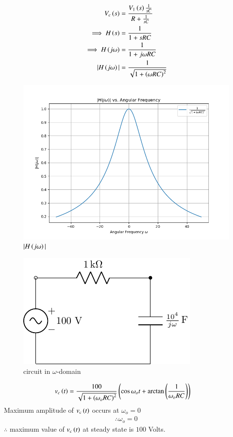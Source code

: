 \documentclass[journal,12pt,twocolumn]{IEEEtran}
\theoremstyle{remark}
\begin{document}
\begin{align}
V_c\left(s\right)&= \frac{V_1\left(s\right)\frac{1}{sC}}{R+\frac{1}{sC}}\\
\implies H\left(s\right) &= \frac{1}{1+ sRC}\\
\implies H\left(j\omega\right) &= \frac{1}{1+j\omega RC}\\
|H\left(j\omega\right)| &= \frac{1}{\sqrt{1+\left(\omega RC\right)^2}}
\end{align}
\begin{figure}[h!]
    \includegraphics[width = \columnwidth]{figs/Figure_1.png}
    \caption{$ |H\left(j\omega\right)|$ }
    \centering
    \label{fig: bm_16_fig_2}
\end{figure}


\begin{figure}[h!]
    \includegraphics[width = \columnwidth]{figs/c_fig2.pdf}
    \caption{circuit in $ \omega$-domain }
    \centering
    \label{fig: bm_16_fig_3}
\end{figure}

\begin{align}
v_c\left(t\right)&= \frac{100}{\sqrt{1+\left(\omega_o RC\right)^2}}\left(\cos{\omega_o t + \arctan\ensuremath{\left(\frac{1}{\omega_o RC}\right)}}\right)
\end{align}
Maximum amplitude of $ v_c\left(t\right)$ occurs at $ \omega_o=0$
\begin{align}
\therefore \omega_o =0
\end{align}
$ \therefore$ maximum value of $ v_c\left(t\right)$ at steady state is $ 100$ Volts.
\end{document}
